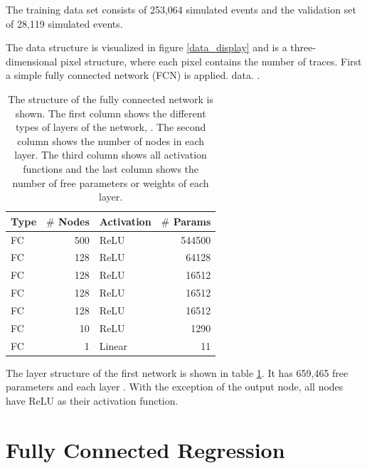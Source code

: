 \documentclass[12pt, a4paper]{thesis}
\begin{document}
The training data set consists of 253,064 simulated events and the
validation set of 28,119 simulated events.

The data structure is visualized in figure \ref{data_display} and is a
three-dimensional pixel structure, where each pixel contains the
number of traces. First a simple fully connected network (FCN) is
applied. %
data.  .

\begin{table}[hbtp]
  \centering
  \begin{tabular}{lrlr}
    Type & \(\#\) Nodes & Activation & \(\#\) Params\\
    \hline
    FC & 500 & ReLU & 544500\\
    FC & 128 & ReLU & 64128\\
    FC & 128 & ReLU & 16512\\
    FC & 128 & ReLU & 16512\\
    FC & 128 & ReLU & 16512\\
    FC & 10 & ReLU & 1290\\
    FC & 1 & Linear & 11\\
  \end{tabular}
  \caption{The structure of the fully connected network is shown. The
    first column shows the different types of layers of the network,
    . The second column shows the number of nodes in each
    layer. The third column shows all activation functions and the
    last column shows the number of free parameters or weights of each
    layer.}
  \label{fcn_structure}
\end{table}

The layer structure of the first network is shown in table
\ref{fcn_structure}.   It has
659,465 free parameters and each layer . With the exception of the output node, all
nodes have ReLU as their activation function. 

\section{Fully Connected Regression}
\label{sec:orgdf3234b}
\end{document}
